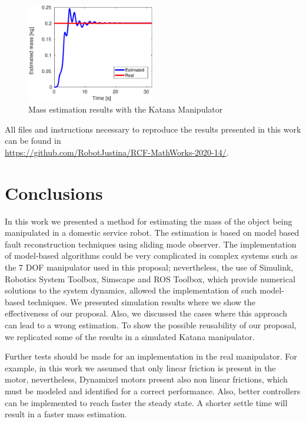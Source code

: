 \documentclass[smallextended]{svjour3}       %
\begin{document}
\begin{figure}
  \centering
  \includegraphics[width=0.5\textwidth]{Figures/katana_mass_est.eps}
  \caption{Mass estimation results with the Katana Manipulator}
  \label{fig:katana_results}
\end{figure}

All files and instructions necessary to reproduce the results presented in this work can be found in\\ \url{https://github.com/RobotJustina/RCF-MathWorks-2020-14/}. 

\section{Conclusions}
\label{sec:Conclusions}
In this work we presented a method for estimating the mass of the object being manipulated in a domestic service robot. The estimation is based on model based fault reconstruction techniques using sliding mode observer. The implementation of model-based algorithms could be very complicated in complex systems such as the 7 DOF manipulator used in this proposal; nevertheless, the use of Simulink, Robotics System Toolbox, Simscape and ROS Toolbox, which provide numerical solutions to the system dynamics, allowed the implementation of such model-based techniques. We presented simulation results where we show the effectiveness of our proposal. Also, we discussed the cases where this approach can lead to a wrong estimation. To show the possible reusability of our proposal, we replicated some of the results in a simulated Katana manipulator. 

Further tests should be made for an implementation in the real manipulator. For example, in this work we assumed that only linear friction is present in the motor, nevertheless, Dynamixel motors present also non linear frictions, which must be modeled and identified for a correct performance. Also, better controllers can be implemented to reach faster the steady state. A shorter settle time will result in a faster mass estimation. 
\end{document}

